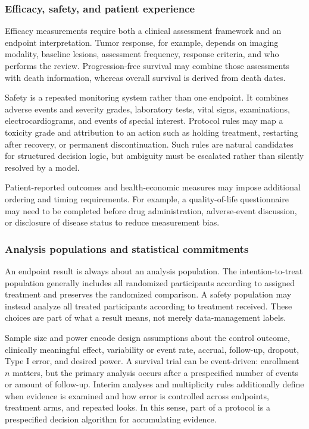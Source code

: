 \documentclass[12pt,oneside]{book}
\numberwithin{equation}{section}
\theoremstyle{definition}
\theoremstyle{plain}
\theoremstyle{remark}
\begin{document}
\subsubsection{Efficacy, safety, and patient experience}

Efficacy measurements require both a clinical assessment framework and an
endpoint interpretation.  Tumor response, for example, depends on imaging
modality, baseline lesions, assessment frequency, response criteria, and who
performs the review.  Progression-free survival may combine those assessments
with death information, whereas overall survival is derived from death dates.

Safety is a repeated monitoring system rather than one endpoint.  It combines
adverse events and severity grades, laboratory tests, vital signs, examinations,
electrocardiograms, and events of special interest.  Protocol rules may map a
toxicity grade and attribution to an action such as holding treatment,
restarting after recovery, or permanent discontinuation.  Such rules are
natural candidates for structured decision logic, but ambiguity must be
escalated rather than silently resolved by a model.

Patient-reported outcomes and health-economic measures may impose additional
ordering and timing requirements.  For example, a quality-of-life questionnaire
may need to be completed before drug administration, adverse-event discussion,
or disclosure of disease status to reduce measurement bias.

\subsubsection{Analysis populations and statistical commitments}

An endpoint result is always about an analysis population.  The
intention-to-treat population generally includes all randomized participants
according to assigned treatment and preserves the randomized comparison.  A
safety population may instead analyze all treated participants according to
treatment received.  These choices are part of what a result means, not merely
data-management labels.

Sample size and power encode design assumptions about the control outcome,
clinically meaningful effect, variability or event rate, accrual, follow-up,
dropout, Type I error, and desired power.  A survival trial can be event-driven:
enrollment $n$ matters, but the primary analysis occurs after a prespecified
number of events or amount of follow-up.  Interim analyses and multiplicity
rules additionally define when evidence is examined and how error is controlled
across endpoints, treatment arms, and repeated looks.  In this sense, part of a
protocol is a prespecified decision algorithm for accumulating evidence.
\end{document}
